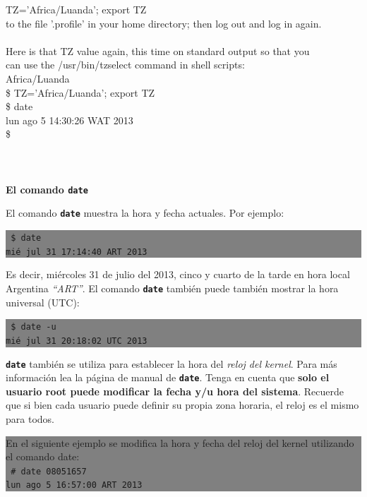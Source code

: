 \documentclass[12pt]{article}
\begin{document}
{{{{	TZ='Africa/Luanda'; export TZ\\
to the file '.profile' in your home directory; then log out and log in again.\\
\\
Here is that TZ value again, this time on standard output so that you\\
can use the /usr/bin/tzselect command in shell scripts:\\
Africa/Luanda\\
\$ TZ='Africa/Luanda'; export TZ\\
\$ date\\
lun ago  5 14:30:26 WAT 2013\\
\$ \\
}
 } \vspace*{0.5cm} } } 
\\ 
\\ 
\\ 
\textbf{El comando \texttt{\textbf{date}}}

El comando \texttt{\textbf{date}} muestra la hora y fecha actuales. Por ejemplo:

\colorbox{grey}{\parbox[t]{0.95\linewidth}{ \vspace*{0.5cm} {\tt 
\$ date \\
mié jul 31 17:14:40 ART 2013
 } \vspace*{0.5cm} } } 

Es decir, miércoles 31 de julio del 2013, cinco y cuarto de la tarde en hora local Argentina  \textit{``ART''}.
El comando \texttt{\textbf{date}} también puede también mostrar la hora universal (UTC): 


\colorbox{grey}{\parbox[t]{0.95\linewidth}{ \vspace*{0.5cm} {\tt 
\$ date -u\\
mié jul 31 20:18:02 UTC 2013
 } \vspace*{0.5cm} } } 


\texttt{\textbf{date}} también se utiliza para establecer la hora del \textit{reloj del kernel}. Para más información
lea la página de manual de \texttt{\textbf{date}}. Tenga en cuenta que \textbf{solo el usuario root puede 
modificar la fecha y/u hora del sistema}. Recuerde que si bien cada usuario puede definir su propia zona horaria, el reloj 
es el mismo para todos.

\colorbox{grey}{\parbox[t]{0.95\linewidth}{ \vspace*{0.5cm}
En el siguiente ejemplo se modifica la hora y fecha del reloj del kernel 
utilizando el comando date: \\
{\tt 
\# date 08051657 \\
lun ago  5 16:57:00 ART 2013
 } \vspace*{0.5cm} } } 
\end{document}
